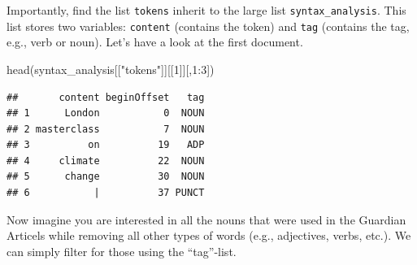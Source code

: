 \documentclass[
]{book}
\newenvironment{Shaded}{\begin{snugshade}}{\end{snugshade}}
\newcommand{\AttributeTok}[1]{\textcolor[rgb]{0.77,0.63,0.00}{#1}}
\newcommand{\CommentTok}[1]{\textcolor[rgb]{0.56,0.35,0.01}{\textit{#1}}}
\newcommand{\DecValTok}[1]{\textcolor[rgb]{0.00,0.00,0.81}{#1}}
\newcommand{\FunctionTok}[1]{\textcolor[rgb]{0.00,0.00,0.00}{#1}}
\newcommand{\NormalTok}[1]{#1}
\newcommand{\OtherTok}[1]{\textcolor[rgb]{0.56,0.35,0.01}{#1}}
\newcommand{\SpecialCharTok}[1]{\textcolor[rgb]{0.00,0.00,0.00}{#1}}
\newcommand{\StringTok}[1]{\textcolor[rgb]{0.31,0.60,0.02}{#1}}
\begin{document}
\begin{Shaded}
\end{Shaded}

Importantly, find the list \texttt{tokens} inherit to the large list \texttt{syntax\_analysis}. This list stores two variables: \texttt{content} (contains the token) and \texttt{tag} (contains the tag, e.g., verb or noun). Let's have a look at the first document.

\begin{Shaded}
\begin{Highlighting}[]
\FunctionTok{head}\NormalTok{(syntax\_analysis[[}\StringTok{"tokens"}\NormalTok{]][[}\DecValTok{1}\NormalTok{]][,}\DecValTok{1}\SpecialCharTok{:}\DecValTok{3}\NormalTok{])}
\end{Highlighting}
\end{Shaded}

\begin{verbatim}
##       content beginOffset   tag
## 1      London           0  NOUN
## 2 masterclass           7  NOUN
## 3          on          19   ADP
## 4     climate          22  NOUN
## 5      change          30  NOUN
## 6           |          37 PUNCT
\end{verbatim}

Now imagine you are interested in all the nouns that were used in the Guardian Articels while removing all other types of words (e.g., adjectives, verbs, etc.). We can simply filter for those using the ``tag''-list.

\begin{Shaded}
\end{Shaded}
\end{document}
